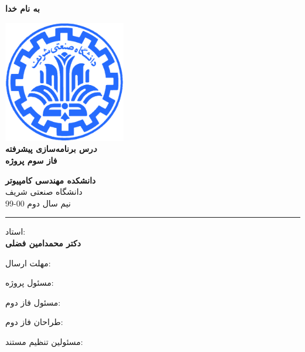 \documentclass[]{article}
\begin{document}
\begin{titlepage}
\begin{center}

\textbf{ \Huge{به نام خدا} }
        
\vspace{0.2cm}

\includegraphics[width=0.4\textwidth]{sharif1.png}\\
\vspace{0.2cm}
\textbf{ \Huge{\emph درس برنامه‌سازی پیشرفته} }\\
\vspace{0.25cm}
\textbf{ \Large{ فاز سوم پروژه} }
\vspace{0.2cm}
       
 
      \large \textbf{دانشکده مهندسی کامپیوتر}\\\vspace{0.1cm}
    \large   دانشگاه صنعتی شریف\\\vspace{0.2cm}
       \large   ﻧﯿﻢ سال دوم 00-99 \\\vspace{0.10cm}
      \noindent\rule[1ex]{\linewidth}{1pt}
استاد:\\
    \textbf{{دکتر محمدامین فضلی}}



    \vspace{0.20cm}

   مهلت ارسال:\\
    \textbf{}
    \textbf{}

    \vspace{0.10cm}
مسئول پروژه:\\
    \textbf{}
    
        \vspace{0.10cm}
مسئول فاز دوم:\\
    \textbf{\authorFont{}}
    
        \vspace{0.10cm}
طراحان فاز دوم:\\
    \textbf{\authorFont{}}
    
        \vspace{0.05cm}
مسئولین تنظیم مستند:\\
    \textbf{}
    

\end{center}
\end{titlepage}
\end{document}
